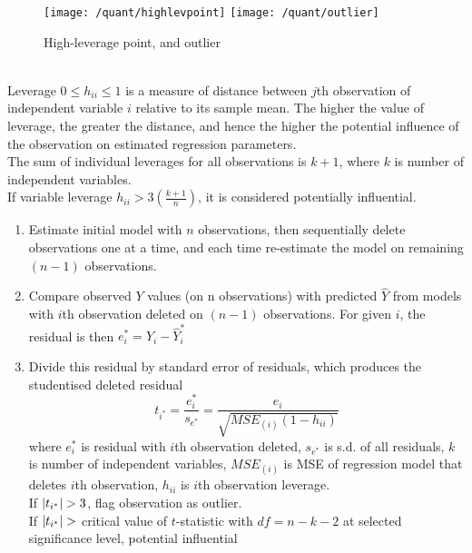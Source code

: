 \begin{figure}[H]
\centering
\texttt{[image: /quant/highlevpoint]}
\texttt{[image: /quant/outlier]}
\caption{High-leverage point, and outlier}
\end{figure}

\begin{remark} \\
Leverage $0 \leq h_{ii} \leq 1$ is a measure of distance between $j$th observation of independent variable $i$ relative to its sample mean. The higher the value of leverage, the greater the distance, and hence the higher the potential influence of the observation on estimated regression parameters.\\
The sum of individual leverages for all observations is $k+1$, where $k$ is number of independent variables.\\
If variable leverage $h_{ii} > 3 \left( \frac{k+1}{n} \right)$, it is considered potentially influential.
\end{remark}

\begin{remark} 
\begin{enumerate}[label=\roman*.]
\setlength{\itemsep}{0pt}
\item Estimate initial model with $n$ observations, then sequentially delete observations one at a time, and each time re-estimate the model on remaining $(n-1)$ observations.
\item Compare observed $Y$ values (on n observations) with predicted $\hat{Y}$ from models with $i$th observation deleted on $(n-1)$ observations. For given $i$, the residual is then $e^{*}_i = Y_i - \hat{Y}_i^{*}$
\item Divide this residual by standard error of residuals, which produces the studentised deleted residual
\begin{equation}
t_{i^*} = \frac{e^{*}_i}{s_{e^*}} = \frac{e_i}{\sqrt{MSE_{(i)} (1-h_{ii})}} \nonumber
\end{equation}
where $e^{*}_i$ is residual with $i$th observation deleted, $s_{e^*}$ is s.d. of all residuals, $k$ is number of independent variables, $MSE_{(i)}$ is MSE of regression model that deletes $i$th observation, $h_{ii}$ is $i$th observation leverage.\\
If $\left\lvert t_{i^*}\right\rvert > 3$, flag observation as outlier.\\
If $\left\lvert t_{i^*}\right\rvert >$ critical value of $t$-statistic with $df=n-k-2$ at selected significance level, potential influential
\end{enumerate}
\end{remark}

